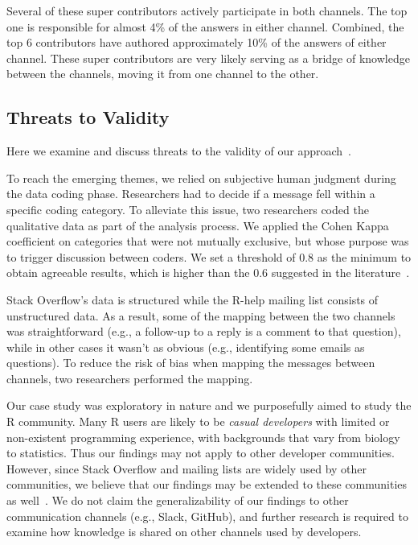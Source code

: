 \documentclass[smallextended]{svjour3}       %
\newcommand{\SO}{Stack Overflow\xspace}
\newcommand{\RH}{R-help\xspace}
\begin{document}
Several of these super contributors actively participate in both channels. The top one is responsible for almost 4\% of
the answers in either channel. Combined, the top 6 contributors have authored approximately 10\% of the answers of
either channel. These super contributors are very likely serving as a bridge of knowledge between the channels, moving
it from one channel to the other.


\subsection{Threats to Validity}
\label{cha:threats}
Here we examine and discuss threats to the validity of our approach~\cite{Runeson2012}.

\begin{description}[itemsep=3pt, topsep=2pt, leftmargin=1em, parsep=0pt]

\item[Construct validity:] To reach the emerging themes, we relied on subjective human judgment during the data coding
  phase. Researchers had to decide if a message fell within a specific coding category. To alleviate this issue, two
  researchers coded the qualitative data as part of the analysis process. We applied the Cohen Kappa coefficient on
  categories that were not mutually exclusive, but whose purpose was to trigger discussion between coders. We set a
  threshold of 0.8 as the minimum to obtain agreeable results, which is higher than the 0.6 suggested in the
  literature~\cite{Landis1977}.

\item[Internal validity:] \SO's data is structured while the \RH mailing list consists of unstructured data. As a
  result, some of the mapping between the two channels was straightforward (e.g., a follow-up to a reply is a comment to
  that question), while in other cases it wasn't as obvious (e.g., identifying some emails as questions). To reduce the
  risk of bias when mapping the messages between channels, two researchers performed the mapping.

\item[External validity:] Our case study was exploratory in nature and we purposefully aimed to study the R
  community. Many R users are likely to be \textit{casual developers} with limited or non-existent programming
  experience, with backgrounds that vary from biology to statistics. Thus our findings may not apply to other developer
  communities. However, since \SO and mailing lists are widely used by other communities, we believe that our findings
  may be extended to these communities as well~\cite{Squire2015a}. We do not claim the generalizability of our findings
  to other communication channels (e.g., Slack, GitHub), and further research is required to examine how knowledge is
  shared on other channels used by developers.

\end{description}
\end{document}
